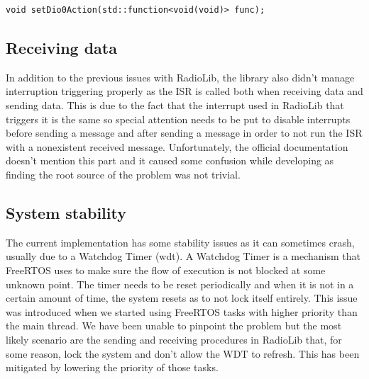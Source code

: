 \begin{lstlisting}[firstnumber=687, caption={[Fragment of PR]Fragment of the PR that would have allowed RadioLib to accept member functions on ISR setup. The rest of the PR touches some internals of the library. This code section belongs to SX127x.cpp}, label=lst:RadioLibPR,captionpos=b]
void setDio0Action(std::function<void(void)> func);
\end{lstlisting}

\subsection{Receiving data}
In addition to the previous issues with RadioLib, the library also didn't manage  interruption triggering properly as the ISR is called both when receiving data and sending data. This is due to the fact that the interrupt used in RadioLib that triggers it is the same so special attention needs to be put to disable interrupts before sending a message and after sending a message in order to not run the ISR with a nonexistent received message. Unfortunately, the official documentation doesn't mention this part and it caused some confusion while developing as finding the root source of the problem was not trivial.
\subsection{System stability}
The current implementation has some stability issues as it can sometimes crash, usually due to a Watchdog Timer (wdt).
A Watchdog Timer is a mechanism that FreeRTOS uses to make sure the flow of execution is not blocked at some unknown point. The timer needs to be reset periodically and when it is not in a certain amount of time, the system resets as to not lock itself entirely. This issue was introduced when we started using FreeRTOS tasks with higher priority than the main thread. We have been unable to pinpoint the problem but the most likely scenario are the sending and receiving procedures in RadioLib that, for some reason, lock the system and don't allow the WDT to refresh. This has been mitigated by lowering the priority of those tasks.